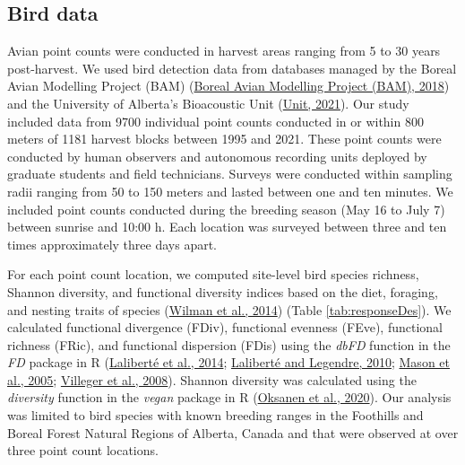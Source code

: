 \documentclass[
  12pt,
]{article}
\begin{document}
\hypertarget{bird-data}{%
\subsection{Bird data}\label{bird-data}}

Avian point counts were conducted in harvest areas ranging from 5 to 30 years post-harvest. We used bird detection data from databases managed by the Boreal Avian Modelling Project (BAM) (\protect\hyperlink{ref-BAM2018}{Boreal Avian Modelling Project (BAM), 2018}) and the University of Alberta's Bioacoustic Unit (\protect\hyperlink{ref-bioacousticunit2021}{Unit, 2021}). Our study included data from 9700 individual point counts conducted in or within 800 meters of 1181 harvest blocks between 1995 and 2021. These point counts were conducted by human observers and autonomous recording units deployed by graduate students and field technicians. Surveys were conducted within sampling radii ranging from 50 to 150 meters and lasted between one and ten minutes. We included point counts conducted during the breeding season (May 16 to July 7) between sunrise and 10:00 h. Each location was surveyed between three and ten times approximately three days apart.

For each point count location, we computed site-level bird species richness, Shannon diversity, and functional diversity indices based on the diet, foraging, and nesting traits of species (\protect\hyperlink{ref-EltonTraits2021}{Wilman et al., 2014}) (Table \ref{tab:responseDes}). We calculated functional divergence (FDiv), functional evenness (FEve), functional richness (FRic), and functional dispersion (FDis) using the \emph{dbFD} function in the \emph{FD} package in R (\protect\hyperlink{ref-R-FD}{Laliberté et al., 2014}; \protect\hyperlink{ref-laliberteDistanceBasedFramework2010}{Laliberté and Legendre, 2010}; \protect\hyperlink{ref-masonFunctionalRichnessFunctional2005}{Mason et al., 2005}; \protect\hyperlink{ref-villegerNewMultidimensionalFunctional2008}{Villeger et al., 2008}). Shannon diversity was calculated using the \emph{diversity} function in the \emph{vegan} package in R (\protect\hyperlink{ref-R-vegan}{Oksanen et al., 2020}). Our analysis was limited to bird species with known breeding ranges in the Foothills and Boreal Forest Natural Regions of Alberta, Canada and that were observed at over three point count locations.
\end{document}
